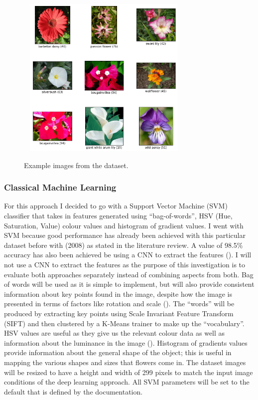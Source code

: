 \documentclass{article}
\begin{document}
\begin{figure}[h]\
    \centering
    \includegraphics[width=0.7\textwidth]{ox102examples.png}
    \caption{Example images from the dataset.}
    \label{fig:ox102}
\end{figure}

\subsubsection{Classical Machine Learning}

For this approach I decided to go with a Support Vector Machine (SVM) classifier that takes in features generated using 
“bag-of-words”, HSV (Hue, Saturation, Value) colour values and histogram of gradient values. I went with SVM because 
good performance has already been achieved with this particular dataset before with \citeauthor{Nilsback2008} (2008) as 
stated in the 
literature review. A value of 98.5\% accuracy has also been achieved be using a CNN to extract the features 
(\cite{mete}). I will not use a CNN to extract the features as the purpose of this investigation is to evaluate both 
approaches separately instead of combining aspects from both. Bag of words will be used as it is simple to implement, 
but will also provide consistent information about key points found in the image, despite how the image is presented in 
terms of factors like rotation and scale (\cite{mohan}).
The “words” will be produced by extracting key points using Scale Invariant Feature
Transform (SIFT) and then clustered by a K-Means trainer to make up the “vocabulary”. HSV values are useful as they give
us the relevant colour data as well as information about the 
luminance in the image (\cite{chapelle1999support}). Histogram of gradients values provide information about the general
shape of 
the object; this is useful in mapping the various shapes and sizes that flowers come in. The dataset images will be resized to have a height and width of 
299 pixels to match the input image conditions of the deep learning approach. All SVM parameters will be set to the 
default that is defined by the documentation.
\end{document}
